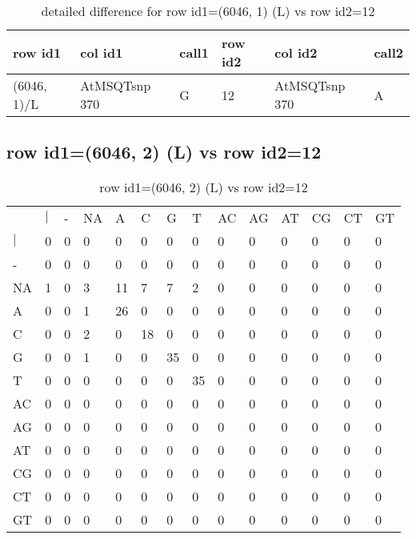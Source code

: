 \begin{center}
\begin{longtable}{|l|l|l|l|l|l|}
\caption{detailed difference for row id1=(6046, 1) (L) vs row id2=12} \label{table_dm39}\\
\hline
row id1&col id1&call1&row id2&col id2&call2\\
\hline
(6046, 1)/L&AtMSQTsnp 370&G&12&AtMSQTsnp 370&A\\
\hline
\end{longtable}
\end{center}

\subsection{row id1=(6046, 2) (L) vs row id2=12}
\begin{center}
\begin{longtable}{|l|l|l|l|l|l|l|l|l|l|l|l|l|l|}
\caption{row id1=(6046, 2) (L) vs row id2=12} \label{table_dm40}\\
\hline
\\
\hline
&$|$&-&NA&A&C&G&T&AC&AG&AT&CG&CT&GT\\
$|$&0&0&0&0&0&0&0&0&0&0&0&0&0\\
-&0&0&0&0&0&0&0&0&0&0&0&0&0\\
NA&1&0&3&11&7&7&2&0&0&0&0&0&0\\
A&0&0&1&26&0&0&0&0&0&0&0&0&0\\
C&0&0&2&0&18&0&0&0&0&0&0&0&0\\
G&0&0&1&0&0&35&0&0&0&0&0&0&0\\
T&0&0&0&0&0&0&35&0&0&0&0&0&0\\
AC&0&0&0&0&0&0&0&0&0&0&0&0&0\\
AG&0&0&0&0&0&0&0&0&0&0&0&0&0\\
AT&0&0&0&0&0&0&0&0&0&0&0&0&0\\
CG&0&0&0&0&0&0&0&0&0&0&0&0&0\\
CT&0&0&0&0&0&0&0&0&0&0&0&0&0\\
GT&0&0&0&0&0&0&0&0&0&0&0&0&0\\
\hline
\end{longtable}
\end{center}

